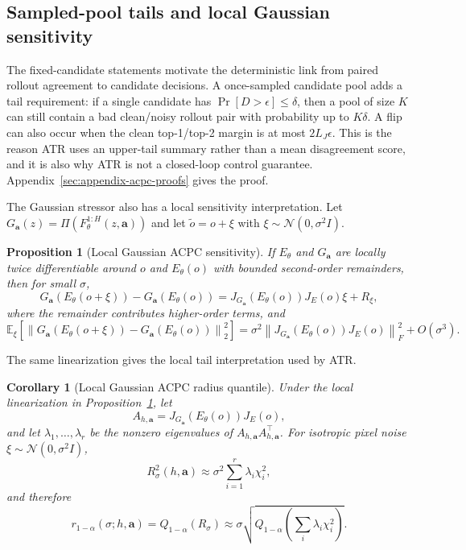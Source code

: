 \documentclass[10pt]{article}
\newtheorem{proposition}{Proposition}
\newtheorem{corollary}{Corollary}
\begin{document}
\subsection{Sampled-pool tails and local Gaussian sensitivity}\label{sec:acpc-sampled-gaussian}

The fixed-candidate statements motivate the deterministic link from paired rollout agreement to candidate decisions. A once-sampled candidate pool adds a tail requirement: if a single candidate has $\Pr[D>\epsilon]\le\delta$, then a pool of size $K$ can still contain a bad clean/noisy rollout pair with probability up to $K\delta$. A flip can also occur when the clean top-1/top-2 margin is at most $2L_J\epsilon$. This is the reason ATR uses an upper-tail summary rather than a mean disagreement score, and it is also why ATR is not a closed-loop control guarantee. Appendix~\ref{sec:appendix-acpc-proofs} gives the proof.

The Gaussian stressor also has a local sensitivity interpretation. Let $G_{\mathbf a}(z)=\Pi(F_\theta^{1:H}(z,\mathbf a))$ and let $\tilde o=o+\xi$ with $\xi\sim\mathcal N(0,\sigma^2 I)$.

\begin{proposition}[Local Gaussian ACPC sensitivity]\label{prop:gaussian-sensitivity}
If $E_\theta$ and $G_{\mathbf a}$ are locally twice differentiable around $o$ and $E_\theta(o)$ with bounded second-order remainders, then for small $\sigma$,
\[
G_{\mathbf a}(E_\theta(o+\xi))-G_{\mathbf a}(E_\theta(o))
=
J_{G_{\mathbf a}}(E_\theta(o))J_E(o)\xi + R_\xi,
\]
where the remainder contributes higher-order terms, and
\[
\mathbb E_\xi\!\left[
\left\|G_{\mathbf a}(E_\theta(o+\xi))-G_{\mathbf a}(E_\theta(o))\right\|_2^2
\right]
=
\sigma^2\left\|J_{G_{\mathbf a}}(E_\theta(o))J_E(o)\right\|_F^2 + O(\sigma^3).
\]
\end{proposition}

The same linearization gives the local tail interpretation used by ATR.

\begin{corollary}[Local Gaussian ACPC radius quantile]\label{cor:gaussian-radius-quantile}
Under the local linearization in Proposition~\ref{prop:gaussian-sensitivity}, let
\[
A_{h,\mathbf a}=J_{G_{\mathbf a}}(E_\theta(o))J_E(o),
\]
and let $\lambda_1,\ldots,\lambda_r$ be the nonzero eigenvalues of
$A_{h,\mathbf a}A_{h,\mathbf a}^\top$. For isotropic pixel noise
$\xi\sim\mathcal N(0,\sigma^2 I)$,
\[
R_\sigma^2(h,\mathbf a)
\approx
\sigma^2\sum_{i=1}^r \lambda_i\chi_i^2,
\]
and therefore
\[
r_{1-\alpha}(\sigma;h,\mathbf a)
=Q_{1-\alpha}(R_\sigma)
\approx
\sigma\sqrt{Q_{1-\alpha}\!\left(\sum_i \lambda_i\chi_i^2\right)}.
\]
\end{corollary}
\end{document}
